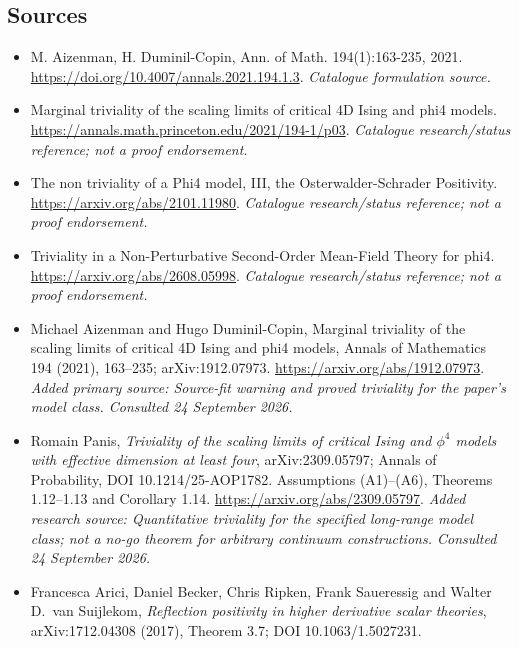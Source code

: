 \documentclass[11pt]{article}
\begin{document}
\subsection{Sources}
\begin{itemize}\raggedright
\item[\textnormal{[S1]}]\hypertarget{source:statement:1}{} M. Aizenman, H. Duminil-Copin, Ann. of Math. 194(1):163-235, 2021.
\url{https://doi.org/10.4007/annals.2021.194.1.3}.
{\small\textit{Catalogue formulation source.}}
\item[\textnormal{[S2]}]\hypertarget{source:statement:2}{} Marginal triviality of the scaling limits of critical 4D Ising and phi4 models.
\url{https://annals.math.princeton.edu/2021/194-1/p03}.
{\small\textit{Catalogue research/status reference; not a proof endorsement.}}
\item[\textnormal{[S3]}]\hypertarget{source:statement:3}{} The non triviality of a Phi4 model, III, the Osterwalder-Schrader Positivity.
\url{https://arxiv.org/abs/2101.11980}.
{\small\textit{Catalogue research/status reference; not a proof endorsement.}}
\item[\textnormal{[S4]}]\hypertarget{source:statement:4}{} Triviality in a Non-Perturbative Second-Order Mean-Field Theory for phi4.
\url{https://arxiv.org/abs/2608.05998}.
{\small\textit{Catalogue research/status reference; not a proof endorsement.}}
\item[\textnormal{[E1]}]\hypertarget{extra:statement:1}{} Michael Aizenman and Hugo Duminil-Copin, Marginal triviality of the scaling limits of critical 4D Ising and phi4 models, Annals of Mathematics 194 (2021), 163--235; arXiv:1912.07973.
\url{https://arxiv.org/abs/1912.07973}.
{\small\textit{Added primary source: Source-fit warning and proved triviality for the paper's model class. Consulted 24 September 2026.}}
\item[\textnormal{[E2]}]\hypertarget{extra:statement:2}{} Romain Panis, \emph{Triviality of the scaling limits of critical Ising and $\phi^4$ models with effective dimension at least four}, arXiv:2309.05797; Annals of Probability, DOI 10.1214/25-AOP1782. Assumptions (A1)--(A6), Theorems 1.12--1.13 and Corollary 1.14.
\url{https://arxiv.org/abs/2309.05797}.
{\small\textit{Added research source: Quantitative triviality for the specified long-range model class; not a no-go theorem for arbitrary continuum constructions. Consulted 24 September 2026.}}
\item[\textnormal{[E3]}]\hypertarget{extra:statement:3}{} Francesca Arici, Daniel Becker, Chris Ripken, Frank Saueressig and Walter D.\ van Suijlekom, \emph{Reflection positivity in higher derivative scalar theories}, arXiv:1712.04308 (2017), Theorem 3.7; DOI 10.1063/1.5027231.

\end{itemize}
\end{document}
